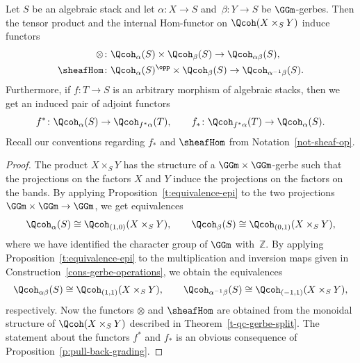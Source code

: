 \begin{corollary}
\label{cor:twisted-tensor}
Let $S$ be an algebraic stack and let $\alpha\colon X \to S$ and~$\beta\colon Y \to S$ be $\GGm$-gerbes.
Then the tensor product and the internal Hom-functor on $\Qcoh(X\times_S Y)$ induce functors
\begin{align*}
\otimes & \colon \Qcoh_{\alpha}(S) \times \Qcoh_{\beta}(S) \to \Qcoh_{\alpha\beta}(S), \\
\sheafHom & \colon \Qcoh_{\alpha}(S)^\opp \times \Qcoh_{\beta}(S)
\to \Qcoh_{\alpha^{-1}\beta}(S).
\end{align*}
Furthermore, if $f\colon T \to S$ is an arbitrary morphism of algebraic stacks,
then we get an induced pair of adjoint functors
\begin{equation*}
  f^* \colon \Qcoh_{\alpha}(S) \to \Qcoh_{f^*\alpha}(T),
  \qquad
  f_* \colon \Qcoh_{f^*\alpha}(T) \to \Qcoh_{\alpha}(S).
\end{equation*}
Recall our conventions regarding $f_*$ and $\sheafHom$ from Notation~\ref{not-sheaf-op}.
\end{corollary}
\begin{proof}
The product $X\times_S Y$ has the structure of a $\GGm\times \GGm$-gerbe
such that the projections on the factors $X$ and $Y$ induce the projections on the factors
on the bands.
By applying Proposition~\ref{t:equivalence-epi} to the two projections $\GGm\times \GGm \to \GGm$,
we get equivalences
$$
\Qcoh_{\alpha}(S) \cong \Qcoh_{(1, 0)}(X\times_S Y), \qquad
\Qcoh_{\beta}(S) \cong \Qcoh_{(0, 1)}(X\times_S Y),
$$
where we have identified the character group of $\GGm$ with~$\mathbb{Z}$.
By applying Proposition~\ref{t:equivalence-epi} to the multiplication and inversion maps
given in Construction~\ref{cons-gerbe-operations},
we obtain the equivalences
$$
\Qcoh_{\alpha\beta}(S) \cong \Qcoh_{(1, 1)}(X\times_S Y), \qquad
\Qcoh_{\alpha^{-1}\beta}(S) \cong \Qcoh_{(-1, 1)}(X\times_S Y),
$$
respectively.
Now the functors $\otimes$ and $\sheafHom$ are obtained from the monoidal structure of $\Qcoh(X\times_S Y)$
described in Theorem~\ref{t-qc-gerbe-split}.
The statement about the functors $f^*$ and $f_*$ is an obvious consequence of Proposition~\ref{p:pull-back-grading}.
\end{proof}

